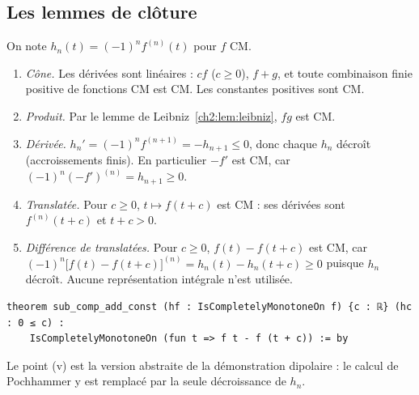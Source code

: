 \subsection{Les lemmes de clôture}
On note $h_n(t)=(-1)^nf^{(n)}(t)$ pour $f$ CM.
\begin{enumerate}[label=(\roman*),itemsep=2pt]
\item \emph{Cône.} Les dérivées sont linéaires : $cf$ ($c\ge0$), $f+g$, et toute combinaison finie positive de
fonctions CM est CM. Les constantes positives sont CM.
\item \emph{Produit.} Par le lemme de Leibniz~\ref{ch2:lem:leibniz}, $fg$ est CM.
\item \emph{Dérivée.} $h_n'=(-1)^nf^{(n+1)}=-h_{n+1}\le0$, donc chaque $h_n$ décroît (accroissements finis). En
particulier $-f'$ est CM, car $(-1)^n(-f')^{(n)}=h_{n+1}\ge0$.
\item \emph{Translatée.} Pour $c\ge0$, $t\mapsto f(t+c)$ est CM : ses dérivées sont $f^{(n)}(t+c)$ et $t+c>0$.
\item \emph{Différence de translatées.} Pour $c\ge0$, $f(t)-f(t+c)$ est CM, car
$(-1)^n\bigl[f(t)-f(t+c)\bigr]^{(n)}=h_n(t)-h_n(t+c)\ge0$ puisque $h_n$ décroît. Aucune représentation intégrale n'est utilisée.
\end{enumerate}
\begin{leanbox}
\begin{lstlisting}[style=chdeux]
theorem sub_comp_add_const (hf : IsCompletelyMonotoneOn f) {c : ℝ} (hc : 0 ≤ c) :
    IsCompletelyMonotoneOn (fun t => f t - f (t + c)) := by
\end{lstlisting}
\end{leanbox}
\noindent Le point (v) est la version abstraite de la démonstration dipolaire : le calcul de Pochhammer y est remplacé par
la seule décroissance de $h_n$.

